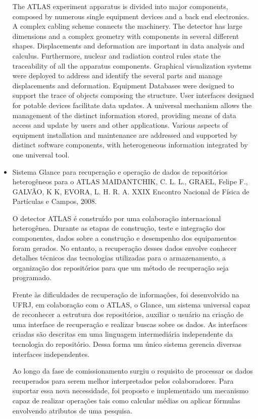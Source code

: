 \begin{itemize}
The ATLAS experiment apparatus is divided into major components, composed by
numerous single equipment devices and a back end electronics. A complex cabling
scheme connects the machinery. The detector has large dimensions and a complex
geometry with components in several different shapes. Displacements and
deformation are important in data analysis and calculus. Furthermore, nuclear
and radiation control rules state the traceability of all the apparatus
components. Graphical visualization systems were deployed to address and
identify the several parts and manage displacements and deformation. Equipment
Databases were designed to support the trace of objects composing the
structure. User interfaces designed for potable devices facilitate data
updates. A universal mechanism allows the management of the distinct
information stored, providing means of data access and update by users and
other applications. Various aspects of equipment installation and maintenance
are addressed and supported by distinct software components, with heterogeneous
information integrated by one universal tool.

\item Sistema Glance para recuperação e operação de dados de repositórios
heterogêneos para o ATLAS
MAIDANTCHIK, C. L. L., GRAEL, Felipe F., GALVÃO, K K, EVORA, L. H. R. A.
XXIX Encontro Nacional de Física de Partículas e Campos, 2008.

O detector ATLAS é construído por uma colaboração internacional heterogênea.
Durante as etapas de construção, teste e integração dos componentes, dados
sobre a construção e desempenho dos equipamentos foram gerados. No entanto, a
recuperação desses dados envolve conhecer detalhes técnicos das tecnologias
utilizadas para o armazenamento, a organização dos repositórios para que um
método de recuperação seja programado.

Frente às dificuldades de recuperação de informações, foi desenvolvido na UFRJ,
em colaboração com o ATLAS, o Glance, um sistema universal capaz de reconhecer
a estrutura dos repositórios, auxiliar o usuário na criação de uma interface de
recuperação e realizar buscas sobre os dados. As interfaces criadas são
descritas em uma linguagem intermediária independente da tecnologia do
repositório. Dessa forma um único sistema gerencia diversas interfaces
independentes.

Ao longo da fase de comissionamento surgiu o requisito de processar os dados
recuperados para serem melhor interpretados pelos colaboradores. Para suportar
essa nova necessidade, foi proposto e implementado um mecanismo capaz de
realizar operações tais como calcular médias ou aplicar fórmulas envolvendo
atributos de uma pesquisa.


\end{itemize}
